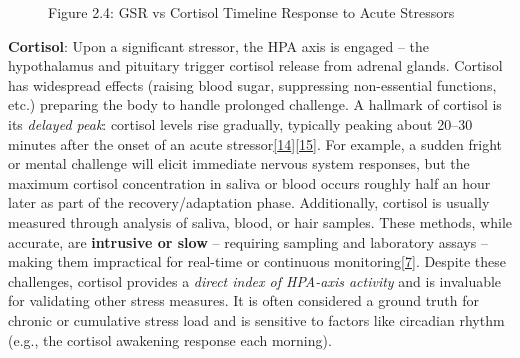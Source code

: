 \documentclass[12pt,a4paper]{article}
\begin{document}
\begin{figure}
\centering
{}
\caption{Figure 2.4: GSR vs Cortisol Timeline Response to Acute Stressors}
\end{figure}

\textbf{Cortisol}: Upon a significant stressor, the HPA axis is engaged -- the hypothalamus and pituitary trigger cortisol release from adrenal glands. Cortisol has widespread effects (raising blood sugar, suppressing non-essential functions, etc.) preparing the body to handle prolonged challenge. A hallmark of cortisol is its \emph{delayed peak}: cortisol levels rise gradually, typically peaking about 20--30 minutes after the onset of an acute stressor\href{https://www.frontiersin.org/journals/computer-science/articles/10.3389/fcomp.2020.00039/full\#:~:text=The\%20salivary\%20cortisol\%20response\%20\%28e,is\%20a\%20decay\%20time\%20constant}{{[}14{]}}\href{https://www.frontiersin.org/journals/computer-science/articles/10.3389/fcomp.2020.00039/full\#:~:text=Since\%20psychological\%20stress\%20results\%20in,Poh\%20et}{{[}15{]}}. For example, a sudden fright or mental challenge will elicit immediate nervous system responses, but the maximum cortisol concentration in saliva or blood occurs roughly half an hour later as part of the recovery/adaptation phase. Additionally, cortisol is usually measured through analysis of saliva, blood, or hair samples. These methods, while accurate, are \textbf{intrusive or slow} -- requiring sampling and laboratory assays -- making them impractical for real-time or continuous monitoring\href{https://www.frontiersin.org/journals/computer-science/articles/10.3389/fcomp.2020.00039/full\#:~:text=provide\%20people\%20with\%20a\%20means,the\%20basis\%20for\%20such\%20support}{{[}7{]}}. Despite these challenges, cortisol provides a \emph{direct index of HPA-axis activity} and is invaluable for validating other stress measures. It is often considered a ground truth for chronic or cumulative stress load and is sensitive to factors like circadian rhythm (e.g., the cortisol awakening response each morning).
\end{document}
